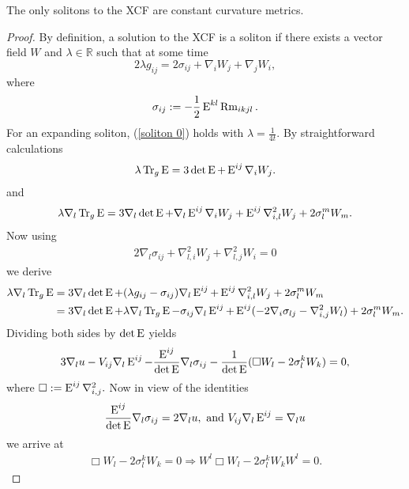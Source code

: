 \documentclass[a4paper,12pt]{amsart}
\begin{document}
\begin{thm}
The only solitons to the XCF are constant curvature metrics.
\end{thm}

\begin{proof}
By definition, a solution to the XCF is a soliton if there exists a vector field $W$ and $\lambda\in \mathbb{R}$ such that at some time
\begin{equation}\label{soliton 0}
2\lambda g_{ij}=2\sigma_{ij}+\nabla_iW_j+\nabla_jW_i,
\end{equation}
where \begin{equation}
\sigma_{ij}:=-\frac{1}{2}\operatorname{E}^{kl}\operatorname{Rm}_{ikjl}.
\end{equation}
For an expanding soliton, (\ref{soliton 0}) holds with $\lambda=\frac{1}{4t}.$ By straightforward calculations
\begin{align}\label{trace}
\lambda \operatorname{Tr}_g \operatorname{E}=3\det\operatorname{E}+\operatorname{E}^{ij}\nabla_iW_j.
\end{align}
and
\begin{align}\label{equ00}
\lambda \nabla_l \operatorname{Tr}_g \operatorname{E}=3\nabla_l\det\operatorname{E}+\nabla_l \operatorname{E}^{ij}\nabla_iW_j+\operatorname{E}^{ij}\nabla^2_{i,l}W_j+2\sigma_l^mW_m.
\end{align}
Now using
\begin{align}\label{eq: soliton derv}
2\nabla_l\sigma_{ij}+\nabla^2_{l,i}W_j+\nabla^2_{l,j}W_i=0
\end{align}
we derive
\begin{align}
\lambda \nabla_l \operatorname{Tr}_g \operatorname{E}&=3\nabla_l\det\operatorname{E}+(\lambda g_{ij}-\sigma_{ij})\nabla_l \operatorname{E}^{ij}+\operatorname{E}^{ij}\nabla^2_{i,l}W_j+2\sigma_l^mW_m\nonumber\\
&=3\nabla_l\det\operatorname{E}+\lambda \nabla_l \operatorname{Tr}_g \operatorname{E}-\sigma_{ij}\nabla_l \operatorname{E}^{ij}+\operatorname{E}^{ij}(-2\nabla_i\sigma_{lj}-\nabla^2_{i,j}W_l)+2\sigma_l^mW_m.
\end{align}
Dividing both sides by $\det\operatorname{E}$ yields
\begin{align}
3\nabla_lu-V_{ij}\nabla_l \operatorname{E}^{ij}-\frac{\operatorname{E}^{ij}}{\det\operatorname{E}}\nabla_l\sigma_{ij}-\frac{1}{\det\operatorname{E}}(\Box W_l-2\sigma_l^kW_k)=0,
\end{align}
where \(\Box:=\operatorname{E}^{ij}\nabla^2_{i,j}.\)
Now in view of the identities
\begin{equation}\label{eq0}
\frac{\operatorname{E}^{ij}}{\det\operatorname{E}}\nabla_l\sigma_{ij}=2\nabla_lu,~\mbox{and}~ V_{ij}\nabla_l\operatorname{E}^{ij}=\nabla_lu
\end{equation}
we arrive at
\begin{align}
\Box W_l-2\sigma_l^kW_k=0\Rightarrow W^l\Box W_l-2\sigma_l^kW_kW^l=0.

\end{align}
\end{proof}
\end{document}
